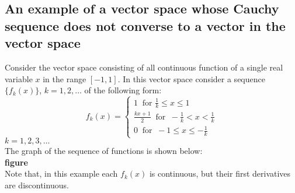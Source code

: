 \subsection{An example of a vector space whose Cauchy sequence does not converse to a vector in the vector space}
Consider the vector space consisting of all continuous function of a single real variable $x$ in the range $[-1, 1]$. In this vector space consider a sequence $\{f_k (x) \}$, $k = 1,2,\ldots$ of the following form:
\begin{equation}\label{eqn:2.91}
f_k(x) = \begin{cases}
1 \ \text{ for } \frac{1}{k} \leq x \leq 1 \\
\frac{k x + 1}{2} \ \text{ for } \ -\frac{1}{k} < x < \frac{1}{k} \\
0 \ \text{ for } \ -1 \leq x \leq - \frac{1}{k}
\end{cases}
\end{equation}
$k = 1, 2, 3, \ldots$\\
The graph of the sequence of functions is shown below:
\\	
\textbf{figure}
\\
Note that,  in this example each $f_k(x)$ is continuous, but their first derivatives are discontinuous.\\

